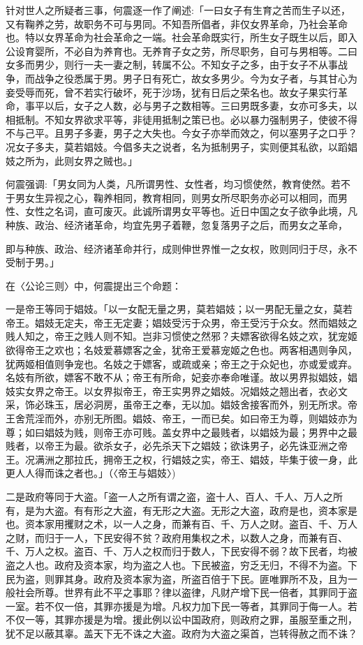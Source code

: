 针对世人之所疑者三事，何震逐一作了阐述:「一曰女子有生育之苦而生子以还，又有鞠养之劳，故职务不可与男同。不知吾所倡者，非仅女界革命，乃社会革命也。特以女界革命为社会革命之一端。社会革命既实行，所生女子既生以后，即入公设育婴所，不必自为养育也。无养育子女之劳，所尽职务，自可与男相等。二曰女多而男少，则行一夫一妻之制，转属不公。不知女子之多，由于女子不从事战争，而战争之役悉属于男。男子日有死亡，故女多男少。今为女子者，与其甘心为妾受辱而死，曾不若实行破坏，死于沙场，犹有日后之荣名也。故女子果实行革命，事平以后，女子之人数，必与男子之数相等。三曰男既多妻，女亦可多夫，以相抵制。不知女界欲求平等，非徒用抵制之策已也。必以暴力强制男子，使彼不得不与己平。且男子多妻，男子之大失也。今女子亦举而效之，何以塞男子之口乎？况女子多夫，莫若娼妓。今倡多夫之说者，名为抵制男子，实则便其私欲，以蹈娼妓之所为，此则女界之贼也。」

何震强调:「男女同为人类，凡所谓男性、女性者，均习惯使然，教育使然。若不于男女生异视之心，鞠养相同，教育相同，则男女所尽职务亦必可以相同，而男性、女性之名词，直可废灭。此诚所谓男女平等也。近日中国之女子欲争此境，凡种族、政治、经济诸革命，均宜先男子着鞭，忽复落男子之后，而男女之革命，


\noindent 即与种族、政治、经济诸革命并行，成则伸世界惟一之女权，败则同归于尽，永不受制于男。」

在〈公论三则〉中，何震提出三个命题：

一是帝王等同于娼妓。「以一女配无量之男，莫若娼妓；以一男配无量之女，莫若帝王。娼妓无定夫，帝王无定妻；娼妓受污于众男，帝王受污于众女。然而娼妓之贱人知之，帝王之贱人则不知。岂非习惯使之然邪？夫嫖客欲得名妓之欢，犹宠姬欲得帝王之欢也；名妓爱慕嫖客之金，犹帝王爱慕宠姬之色也。两客相遇则争风，犹两姬相值则争宠也。名妓之于嫖客，或疏或亲；帝王之于众妃也，亦或爱或弃。名妓有所欲，嫖客不敢不从；帝王有所命，妃妾亦奉命唯谨。故以男界拟娼妓，娼妓实女界之帝王。以女界拟帝王，帝王实男界之娼妓。况娼妓之翘出者，衣必文采，饰必珠玉，居必洞房，虽帝王之奉，无以加。娼妓舍接客而外，别无所求。帝王舍荒淫而外，亦别无所图。娼妓、帝王，一而已矣。如曰帝王为尊，则娼妓亦为尊；如曰娼妓为贱，则帝王亦可贱。盖女界中之最贱者，以娼妓为最；男界中之最贱者，以帝王为最。欲杀女子，必先杀天下之娼妓；欲诛男子，必先诛亚洲之帝王。况满洲之那拉氏，拥帝王之权，行娼妓之实，帝王、娼妓，毕集于彼一身，此更人人得而诛之者也。」（〈帝王与娼妓〉)

二是政府等同于大盗。「盗一人之所有谓之盗，盗十人、百人、千人、万人之所有，是为大盗。有有形之大盗，有无形之大盗。无形之大盗，政府是也，资本家是也。资本家用攫财之术，以一人之身，而兼有百、千、万人之财。盗百、千、万人之财，而归于一人，下民安得不贫？政府用集权之术，以数人之身，而兼有百、千、万人之权。盗百、千、万人之权而归于数人，下民安得不弱？故下民者，均被盗之人也。政府及资本家，均为盗之人也。下民被盗，穷乏无归，不得不为盗。下民为盗，则罪其身。政府及资本家为盗，所盗百倍于下民。匪唯罪所不及，且为一般社会所尊。世界有此不平之事耶？律以盗律，凡财产增下民一倍者，其罪同于盗一室。若不仅一倍，其罪亦援是为增。凡权力加下民一等者，其罪同于侮一人。若不仅一等，其罪亦援是为增。援此例以讼中国政府，则政府之罪，虽服至重之刑，犹不足以蔽其辜。盖天下无不诛之大盗。政府为大盗之渠首，岂转得赦之而不诛？


